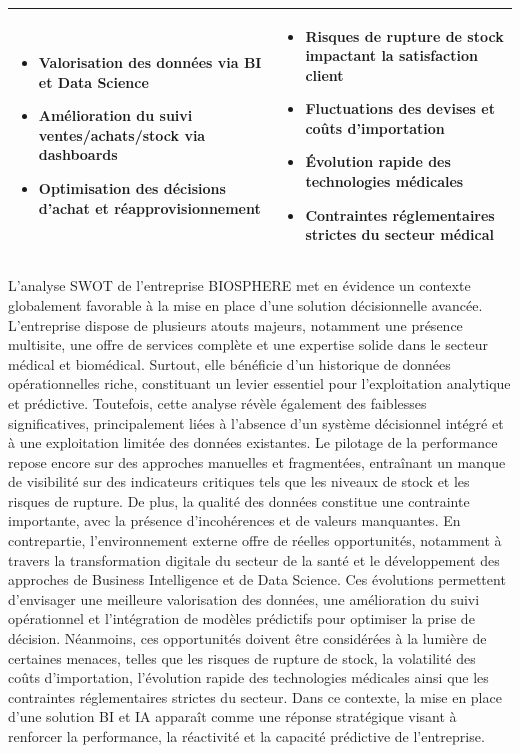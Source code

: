 \begin{table}[H]
\begin{tabular}{|p{6.5cm}|p{6.5cm}|}
\begin{itemize}
    \item Valorisation des données via BI et Data Science
    \item Amélioration du suivi ventes/achats/stock via dashboards
    \item Optimisation des décisions d'achat et réapprovisionnement
\end{itemize} & 
\begin{itemize}
    \item Risques de rupture de stock impactant la satisfaction client
    \item Fluctuations des devises et coûts d'importation
    \item Évolution rapide des technologies médicales
    \item Contraintes réglementaires strictes du secteur médical
\end{itemize} \\ \hline
\end{tabular}
\end{table}
L’analyse SWOT de l’entreprise BIOSPHERE met en évidence un contexte globalement favorable à la mise en place d’une solution décisionnelle avancée. L’entreprise dispose de plusieurs atouts majeurs, notamment une présence multisite, une offre de services complète et une expertise solide dans le secteur médical et biomédical. Surtout, elle bénéficie d’un historique de données opérationnelles riche, constituant un levier essentiel pour l’exploitation analytique et prédictive.
Toutefois, cette analyse révèle également des faiblesses significatives, principalement liées à l’absence d’un système décisionnel intégré et à une exploitation limitée des données existantes. Le pilotage de la performance repose encore sur des approches manuelles et fragmentées, entraînant un manque de visibilité sur des indicateurs critiques tels que les niveaux de stock et les risques de rupture. De plus, la qualité des données constitue une contrainte importante, avec la présence d’incohérences et de valeurs manquantes.
En contrepartie, l’environnement externe offre de réelles opportunités, notamment à travers la transformation digitale du secteur de la santé et le développement des approches de Business Intelligence et de Data Science. Ces évolutions permettent d’envisager une meilleure valorisation des données, une amélioration du suivi opérationnel et l’intégration de modèles prédictifs pour optimiser la prise de décision.
Néanmoins, ces opportunités doivent être considérées à la lumière de certaines menaces, telles que les risques de rupture de stock, la volatilité des coûts d’importation, l’évolution rapide des technologies médicales ainsi que les contraintes réglementaires strictes du secteur. Dans ce contexte, la mise en place d’une solution BI et IA apparaît comme une réponse stratégique visant à renforcer la performance, la réactivité et la capacité prédictive de l’entreprise.

